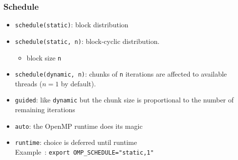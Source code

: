 \documentclass{beamer}
\begin{document}
\begin{frame}
  \frametitle{Schedule}

  \begin{itemize}
  \item \texttt{schedule(static)}: block distribution
    
  \item \texttt{schedule(static, n)}: block-cyclic distribution.
    \begin{itemize}
    \item block size \texttt{n}
    \end{itemize}


  \item \texttt{schedule(dynamic, n)}: chunks of \texttt{n} iterations are affected to available threads
  ($n = 1$ by default).


  \item \texttt{guided}: like \texttt{dynamic} but the chunk size is proportional to the number of remaining iterations 


\item \texttt{auto}: the OpenMP runtime does its magic
  
  \item \texttt{runtime}: choice is deferred until runtime \\
    Example~: {\tt export OMP\_SCHEDULE="static,1"}
  \end{itemize}
\end{frame}

\end{document}
